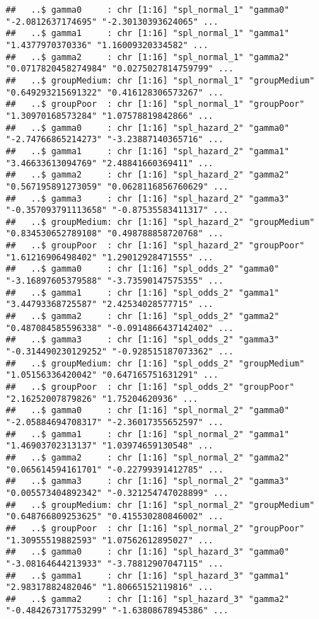 \documentclass[
]{article}
\begin{document}
\begin{verbatim}
##   ..$ gamma0     : chr [1:16] "spl_normal_1" "gamma0" "-2.0812637174695" "-2.30130393624065" ...
##   ..$ gamma1     : chr [1:16] "spl_normal_1" "gamma1" "1.4377970370336" "1.16009320334582" ...
##   ..$ gamma2     : chr [1:16] "spl_normal_1" "gamma2" "0.0717820458274984" "0.0275027814759799" ...
##   ..$ groupMedium: chr [1:16] "spl_normal_1" "groupMedium" "0.649293215691322" "0.416128306573267" ...
##   ..$ groupPoor  : chr [1:16] "spl_normal_1" "groupPoor" "1.30970168573284" "1.07578819842866" ...
##   ..$ gamma0     : chr [1:16] "spl_hazard_2" "gamma0" "-2.74766865214273" "-3.23887140365716" ...
##   ..$ gamma1     : chr [1:16] "spl_hazard_2" "gamma1" "3.46633613094769" "2.48841660369411" ...
##   ..$ gamma2     : chr [1:16] "spl_hazard_2" "gamma2" "0.567195891273059" "0.0628116856760629" ...
##   ..$ gamma3     : chr [1:16] "spl_hazard_2" "gamma3" "-0.357093791113658" "-0.87535583411317" ...
##   ..$ groupMedium: chr [1:16] "spl_hazard_2" "groupMedium" "0.834530652789108" "0.498788858720768" ...
##   ..$ groupPoor  : chr [1:16] "spl_hazard_2" "groupPoor" "1.61216906498402" "1.29012928471555" ...
##   ..$ gamma0     : chr [1:16] "spl_odds_2" "gamma0" "-3.16897605379588" "-3.73590147575355" ...
##   ..$ gamma1     : chr [1:16] "spl_odds_2" "gamma1" "3.44793368725587" "2.42534028577715" ...
##   ..$ gamma2     : chr [1:16] "spl_odds_2" "gamma2" "0.487084585596338" "-0.0914866437142402" ...
##   ..$ gamma3     : chr [1:16] "spl_odds_2" "gamma3" "-0.314490230129252" "-0.928515187073362" ...
##   ..$ groupMedium: chr [1:16] "spl_odds_2" "groupMedium" "1.05156336420042" "0.647165751631291" ...
##   ..$ groupPoor  : chr [1:16] "spl_odds_2" "groupPoor" "2.16252007879826" "1.75204620936" ...
##   ..$ gamma0     : chr [1:16] "spl_normal_2" "gamma0" "-2.05884694708317" "-2.36017355652597" ...
##   ..$ gamma1     : chr [1:16] "spl_normal_2" "gamma1" "1.46903702313137" "1.03974659130548" ...
##   ..$ gamma2     : chr [1:16] "spl_normal_2" "gamma2" "0.065614594161701" "-0.22799391412785" ...
##   ..$ gamma3     : chr [1:16] "spl_normal_2" "gamma3" "0.005573404892342" "-0.321254747028899" ...
##   ..$ groupMedium: chr [1:16] "spl_normal_2" "groupMedium" "0.648766809253625" "0.415530280846002" ...
##   ..$ groupPoor  : chr [1:16] "spl_normal_2" "groupPoor" "1.30955519882593" "1.07562612895027" ...
##   ..$ gamma0     : chr [1:16] "spl_hazard_3" "gamma0" "-3.08164644213933" "-3.78812907047115" ...
##   ..$ gamma1     : chr [1:16] "spl_hazard_3" "gamma1" "2.98317882482046" "1.80665152119816" ...
##   ..$ gamma2     : chr [1:16] "spl_hazard_3" "gamma2" "-0.484267317753299" "-1.63808678945386" ...

\end{verbatim}
\end{document}
